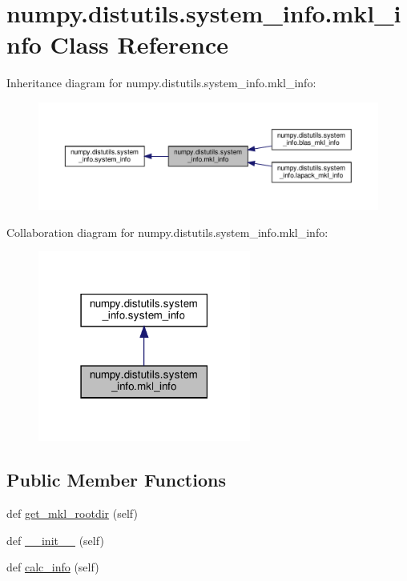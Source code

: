 \hypertarget{classnumpy_1_1distutils_1_1system__info_1_1mkl__info}{}\section{numpy.\+distutils.\+system\+\_\+info.\+mkl\+\_\+info Class Reference}
\label{classnumpy_1_1distutils_1_1system__info_1_1mkl__info}


Inheritance diagram for numpy.\+distutils.\+system\+\_\+info.\+mkl\+\_\+info\+:
\nopagebreak
\begin{figure}[H]
\begin{center}
\leavevmode
\includegraphics[width=350pt]{classnumpy_1_1distutils_1_1system__info_1_1mkl__info__inherit__graph}
\end{center}
\end{figure}


Collaboration diagram for numpy.\+distutils.\+system\+\_\+info.\+mkl\+\_\+info\+:
\nopagebreak
\begin{figure}[H]
\begin{center}
\leavevmode
\includegraphics[width=198pt]{classnumpy_1_1distutils_1_1system__info_1_1mkl__info__coll__graph}
\end{center}
\end{figure}
\subsection*{Public Member Functions}
\begin{DoxyCompactItemize}
\item 
def \hyperlink{classnumpy_1_1distutils_1_1system__info_1_1mkl__info_a7ae518832943c1b0a63e446fe1639844}{get\+\_\+mkl\+\_\+rootdir} (self)
\item 
def \hyperlink{classnumpy_1_1distutils_1_1system__info_1_1mkl__info_ac8818831a3c16484e93b38ff38b214d9}{\+\_\+\+\_\+init\+\_\+\+\_\+} (self)
\item 
def \hyperlink{classnumpy_1_1distutils_1_1system__info_1_1mkl__info_a7829fb1e9536bb2542b927230e2fffd6}{calc\+\_\+info} (self)
\end{DoxyCompactItemize}

